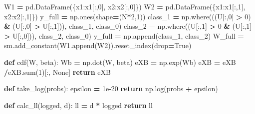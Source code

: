 \documentclass[
]{book}
\newenvironment{Shaded}{\begin{snugshade}}{\end{snugshade}}
\newcommand{\BuiltInTok}[1]{#1}
\newcommand{\ControlFlowTok}[1]{\textcolor[rgb]{0.13,0.29,0.53}{\textbf{#1}}}
\newcommand{\DecValTok}[1]{\textcolor[rgb]{0.00,0.00,0.81}{#1}}
\newcommand{\FloatTok}[1]{\textcolor[rgb]{0.00,0.00,0.81}{#1}}
\newcommand{\KeywordTok}[1]{\textcolor[rgb]{0.13,0.29,0.53}{\textbf{#1}}}
\newcommand{\NormalTok}[1]{#1}
\newcommand{\OperatorTok}[1]{\textcolor[rgb]{0.81,0.36,0.00}{\textbf{#1}}}
\newcommand{\StringTok}[1]{\textcolor[rgb]{0.31,0.60,0.02}{#1}}
\newcommand{\VariableTok}[1]{\textcolor[rgb]{0.00,0.00,0.00}{#1}}
\theoremstyle{definition}
\theoremstyle{definition}
\theoremstyle{definition}
\theoremstyle{remark}
\begin{document}
\begin{Shaded}
\begin{Highlighting}[]
\NormalTok{W1 }\OperatorTok{=}\NormalTok{ pd.DataFrame(\{}\StringTok{\textquotesingle{}x1\textquotesingle{}}\NormalTok{:x1[:,}\DecValTok{0}\NormalTok{], }\StringTok{\textquotesingle{}x2\textquotesingle{}}\NormalTok{:x2[:,}\DecValTok{0}\NormalTok{]\})}
\NormalTok{W2 }\OperatorTok{=}\NormalTok{ pd.DataFrame(\{}\StringTok{\textquotesingle{}x1\textquotesingle{}}\NormalTok{:x1[:,}\DecValTok{1}\NormalTok{], }\StringTok{\textquotesingle{}x2\textquotesingle{}}\NormalTok{:x2[:,}\DecValTok{1}\NormalTok{]\})}
\NormalTok{y\_full }\OperatorTok{=}\NormalTok{ np.ones(shape}\OperatorTok{=}\NormalTok{(N}\OperatorTok{*}\DecValTok{2}\NormalTok{,}\DecValTok{1}\NormalTok{))}
\NormalTok{class\_1 }\OperatorTok{=}\NormalTok{ np.where(((U[:,}\DecValTok{0}\NormalTok{] }\OperatorTok{\textgreater{}} \DecValTok{0}\NormalTok{) }\OperatorTok{\&}\NormalTok{ (U[:,}\DecValTok{0}\NormalTok{] }\OperatorTok{\textgreater{}}\NormalTok{ U[:,}\DecValTok{1}\NormalTok{])), }\StringTok{\textquotesingle{}class\_1\textquotesingle{}}\NormalTok{, }\StringTok{\textquotesingle{}class\_0\textquotesingle{}}\NormalTok{)}
\NormalTok{class\_2 }\OperatorTok{=}\NormalTok{ np.where((U[:,}\DecValTok{1}\NormalTok{] }\OperatorTok{\textgreater{}} \DecValTok{0} \OperatorTok{\&}\NormalTok{ (U[:,}\DecValTok{1}\NormalTok{] }\OperatorTok{\textgreater{}}\NormalTok{ U[:,}\DecValTok{0}\NormalTok{])), }\StringTok{\textquotesingle{}class\_2\textquotesingle{}}\NormalTok{, }\StringTok{\textquotesingle{}class\_0\textquotesingle{}}\NormalTok{)}
\NormalTok{y\_full }\OperatorTok{=}\NormalTok{ np.append(class\_1, class\_2)}
\NormalTok{W\_full }\OperatorTok{=}\NormalTok{ sm.add\_constant(W1.append(W2)).reset\_index(drop}\OperatorTok{=}\VariableTok{True}\NormalTok{)}


\KeywordTok{def}\NormalTok{ cdf(W, beta):}
\NormalTok{    Wb }\OperatorTok{=}\NormalTok{ np.dot(W, beta)}
\NormalTok{    eXB }\OperatorTok{=}\NormalTok{ np.exp(Wb)}
\NormalTok{    eXB }\OperatorTok{=}\NormalTok{ eXB }\OperatorTok{/}\NormalTok{eXB.}\BuiltInTok{sum}\NormalTok{(}\DecValTok{1}\NormalTok{)[:, }\VariableTok{None}\NormalTok{]}
    \ControlFlowTok{return}\NormalTok{ eXB}

\KeywordTok{def}\NormalTok{ take\_log(probs):}
\NormalTok{    epsilon }\OperatorTok{=} \FloatTok{1e{-}20} 
    \ControlFlowTok{return}\NormalTok{ np.log(probs }\OperatorTok{+}\NormalTok{ epsilon)}

\KeywordTok{def}\NormalTok{ calc\_ll(logged, d):}
\NormalTok{    ll }\OperatorTok{=}\NormalTok{ d }\OperatorTok{*}\NormalTok{ logged}
    \ControlFlowTok{return}\NormalTok{ ll}


\end{Highlighting}
\end{Shaded}
\end{document}
